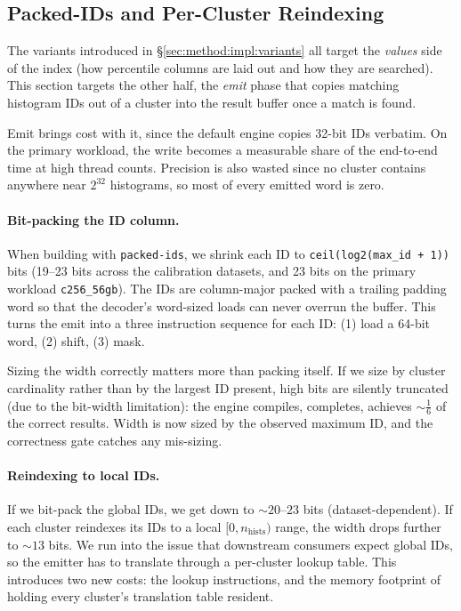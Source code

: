 \subsection{Packed-IDs and Per-Cluster Reindexing\label{sec:method:impl:packed}}

The variants introduced in §\ref{sec:method:impl:variants} all target the \emph{values} side of the index (how percentile columns are laid out and how they are searched). This section targets the other half, the \emph{emit} phase that copies matching histogram IDs out of a cluster into the result buffer once a match is found.

Emit brings cost with it, since the default engine copies 32-bit IDs verbatim. On the primary workload, the write becomes a measurable share of the end-to-end time at high thread counts. Precision is also wasted since no cluster contains anywhere near $2^{32}$ histograms, so most of every emitted word is zero.

\paragraph{Bit-packing the ID column.}  When building with \texttt{packed-ids}, we shrink each ID to \texttt{ceil(log2(max\_id + 1))} bits (19--23 bits across the calibration datasets, and 23 bits on the primary workload \texttt{c256\_56gb}). The IDs are column-major packed with a trailing padding word so that the decoder's word-sized loads can never overrun the buffer. This turns the emit into a three instruction sequence for each ID: (1) load a 64-bit word, (2) shift, (3) mask.

Sizing the width correctly matters more than packing itself. If we size by cluster cardinality rather than by the largest ID present, high bits are silently truncated (due to the bit-width limitation): the engine compiles, completes, achieves $\sim \frac{1}{6}$ of the correct results. Width is now sized by the observed maximum ID, and the correctness gate catches any mis-sizing.

\paragraph{Reindexing to local IDs.} If we bit-pack the global IDs, we get down to $\sim\!20$--$23$ bits (dataset-dependent). If each cluster reindexes its IDs to a local $[0, n_{\text{hists}})$ range, the width drops further to $\sim\!13$ bits. We run into the issue that downstream consumers expect global IDs, so the emitter has to translate through a per-cluster lookup table. This introduces two new costs: the lookup instructions, and the memory footprint of holding every cluster's translation table resident.

